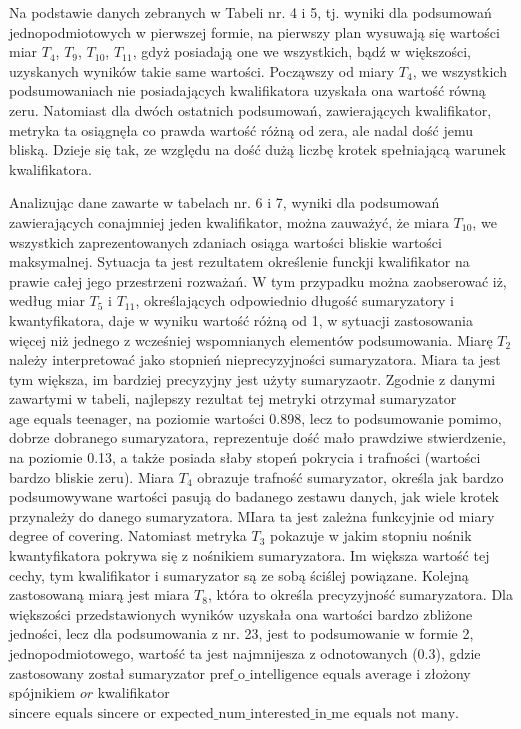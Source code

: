 \documentclass{classrep}
\begin{document}
Na podstawie danych zebranych w Tabeli nr. 4 i 5, tj. wyniki dla podsumowań jednopodmiotowych w pierwszej formie, na pierwszy plan wysuwają się wartości miar $T_4$, $T_9$, $T_{10}$, $T_{11}$, gdyż posiadają one we wszystkich, bądź w większości, uzyskanych wyników takie same wartości. 
Począwszy od miary $T_4$, we wszystkich podsumowaniach nie posiadających kwalifikatora uzyskała ona wartość równą zeru. Natomiast dla dwóch ostatnich podsumowań, zawierających kwalifikator, metryka ta osiągnęła co prawda wartość różną od zera, ale nadal dość jemu bliską. Dzieje się tak, ze względu na dość dużą liczbę krotek spełniającą warunek kwalifikatora.


Analizując dane zawarte w tabelach nr. 6 i 7, wyniki dla podsumowań zawierających conajmniej jeden kwalifikator, można zauważyć, że miara $T_{10}$, we wszystkich zaprezentowanych zdaniach osiąga wartości bliskie wartości maksymalnej.
Sytuacja ta jest rezultatem określenie funckji kwalifikator na prawie całej jego przestrzeni rozważań. W tym przypadku można zaobserować iż, według miar $T_5$ i $T_{11}$, określających odpowiednio długość sumaryzatory i kwantyfikatora, daje w wyniku wartość różną od 1, w sytuacji
zastosowania więcej niż jednego z wcześniej wspomnianych elementów podsumowania. Miarę $T_2$ należy interpretować jako stopnień nieprecyzyjności sumaryzatora. Miara ta jest tym większa, im bardziej precyzyjny jest użyty sumaryzaotr. Zgodnie z danymi zawartymi w tabeli, najlepszy rezultat tej metryki otrzymał sumaryzator \(\text{age equals teenager}\), na poziomie wartości 0.898, lecz to podsumowanie pomimo, dobrze dobranego sumaryzatora, 
reprezentuje dość mało prawdziwe stwierdzenie, na poziomie 0.13, a także posiada słaby stopeń pokrycia i trafności (wartości bardzo bliskie zeru). 
Miara $T_4$ obrazuje trafność sumaryzator, określa jak bardzo podsumowywane wartości pasują do badanego zestawu danych, jak wiele krotek przynależy do danego sumaryzatora. MIara ta jest zależna funkcyjnie od miary \(\text{degree of covering}\). 
Natomiast metryka $T_3$ pokazuje w jakim stopniu nośnik kwantyfikatora pokrywa się z nośnikiem sumaryzatora. Im większa wartość tej cechy, tym kwalifikator i sumaryzator są ze sobą ściślej powiązane.
Kolejną zastosowaną miarą jest miara $T_8$, która to określa precyzyjność sumaryzatora. Dla większości przedstawionych wyników uzyskała ona wartości bardzo zbliżone jedności, lecz dla podsumowania z nr. 23, jest to podsumowanie w formie 2, jednopodmiotowego, wartość ta jest najmnijesza z odnotowanych (0.3), gdzie zastosowany został sumaryzator \(\text{pref\_o\_intelligence equals average}\) i złożony spójnikiem \(or\) kwalifikator 
\(\text{sincere equals sincere or expected\_num\_interested\_in\_me equals not many.}\)
\end{document}

